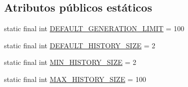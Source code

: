 \subsection*{Atributos públicos estáticos}
\begin{DoxyCompactItemize}
\item 
static final int \hyperlink{classjenes_1_1_genetic_algorithm_3_01_t_01extends_01_chromosome_01_4_a2492ee1b00f5631a1c1b1c6f15ea3421}{D\-E\-F\-A\-U\-L\-T\-\_\-\-G\-E\-N\-E\-R\-A\-T\-I\-O\-N\-\_\-\-L\-I\-M\-I\-T} = 100
\item 
static final int \hyperlink{classjenes_1_1_genetic_algorithm_3_01_t_01extends_01_chromosome_01_4_a23df2e338c3439d7457ff6a150c573e1}{D\-E\-F\-A\-U\-L\-T\-\_\-\-H\-I\-S\-T\-O\-R\-Y\-\_\-\-S\-I\-Z\-E} = 2
\item 
static final int \hyperlink{classjenes_1_1_genetic_algorithm_3_01_t_01extends_01_chromosome_01_4_aa64b297086826bfbda1fbaccebe4cb24}{M\-I\-N\-\_\-\-H\-I\-S\-T\-O\-R\-Y\-\_\-\-S\-I\-Z\-E} = 2
\item 
static final int \hyperlink{classjenes_1_1_genetic_algorithm_3_01_t_01extends_01_chromosome_01_4_acd26085cf69c68d607ef08d0bf829224}{M\-A\-X\-\_\-\-H\-I\-S\-T\-O\-R\-Y\-\_\-\-S\-I\-Z\-E} = 100
\end{DoxyCompactItemize}
